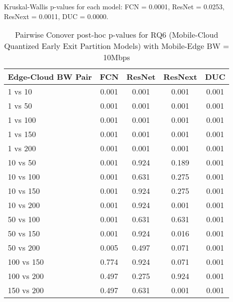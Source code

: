 \begin{table}[h]
\centering
\caption{Pairwise Conover post-hoc p-values for RQ6 (Mobile-Cloud Quantized Early Exit Partition Models) with Mobile-Edge BW = 10Mbps}
\label{tab:conover_mobile_cloud_quantized_earlyexit_partition_me10}
\smallskip
Kruskal-Wallis p-values for each model: FCN = 0.0001, ResNet = 0.0253, ResNext = 0.0011, DUC = 0.0000.

\begin{tabular}{lcccc}
\toprule
Edge-Cloud BW Pair & FCN & ResNet & ResNext & DUC \\
\midrule
1 vs 10 & 0.001 & 0.001 & 0.001 & 0.001 \\
1 vs 50 & 0.001 & 0.001 & 0.001 & 0.001 \\
1 vs 100 & 0.001 & 0.001 & 0.001 & 0.001 \\
1 vs 150 & 0.001 & 0.001 & 0.001 & 0.001 \\
1 vs 200 & 0.001 & 0.001 & 0.001 & 0.001 \\
10 vs 50 & 0.001 & 0.924 & 0.189 & 0.001 \\
10 vs 100 & 0.001 & 0.631 & 0.275 & 0.001 \\
10 vs 150 & 0.001 & 0.924 & 0.275 & 0.001 \\
10 vs 200 & 0.001 & 0.924 & 0.001 & 0.001 \\
50 vs 100 & 0.001 & 0.631 & 0.631 & 0.001 \\
50 vs 150 & 0.001 & 0.924 & 0.016 & 0.001 \\
50 vs 200 & 0.005 & 0.497 & 0.071 & 0.001 \\
100 vs 150 & 0.774 & 0.924 & 0.071 & 0.001 \\
100 vs 200 & 0.497 & 0.275 & 0.924 & 0.001 \\
150 vs 200 & 0.497 & 0.631 & 0.001 & 0.001 \\
\bottomrule
\end{tabular}
\end{table}

